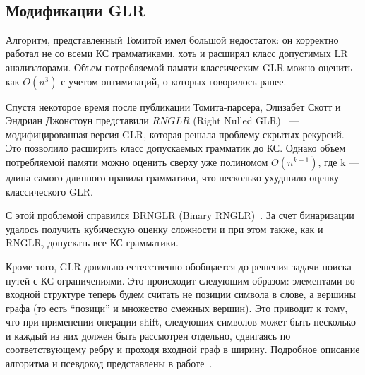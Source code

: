 \begin{example}
\begin{enumerate}
        \\
    \end{enumerate}
    
    
    
\end{example}

\subsection{Модификации GLR}
Алгоритм, представленный Томитой имел большой недостаток: он корректно работал не со всеми КС грамматиками, хоть и расширял класс допустимых LR анализаторами. Объем потребляемой памяти классическим GLR можно оценить как $ O(n^3)$ с учетом оптимизаций, о которых говорилось ранее.

Спустя некоторое время после публикации Томита-парсера, Элизабет Скотт и Эндриан Джонстоун представили $RNGLR$ (Right Nulled GLR)~\cite{Scott:2006:RNG:1146809.1146810} --- модифицированная версия GLR, которая решала проблему скрытых рекурсий. Это позволило расширить класс допускаемых грамматик до КС. Однако объем потребляемой памяти можно оценить сверху уже полиномом $O(n^{k+1})$, где k --- длина самого длинного правила грамматики, что несколько ухудшило оценку классического GLR.

С этой проблемой справился BRNGLR (Binary RNGLR)~\cite{Scott:2007:BCT:1289813.1289815}. За счет бинаризации удалось получить кубическую оценку сложности и при этом также, как и RNGLR, допускать все КС грамматики.

Кроме того, GLR довольно естесственно обобщается до решения задачи поиска путей с КС ограничениями. Это происходит следующим образом: элементами во входной структуре теперь будем считать не позиции символа в слове, а вершины графа (то есть ``позици'' и множество смежных вершин). Это приводит к тому, что при применении операции shift, следующих символов может быть несколько и каждый из них должен быть рассмотрен отдельно, сдвигаясь по соответствующему ребру и проходя входной граф в ширину. Подробное описание алгоритма и псевдокод представлены в работе~\cite{10.1007/978-3-319-41579-6_22}.

